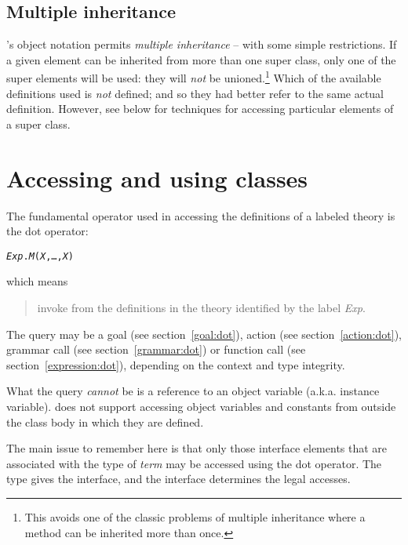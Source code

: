\subsection{Multiple inheritance}
\go's object notation permits \emph{multiple inheritance} -- with some simple restrictions. If a given element can be inherited from more than one super class, only one of the super elements will be used: they will \emph{not} be unioned.\footnote{This avoids one of the classic problems of multiple inheritance where a method can be inherited more than once.} Which of the available definitions used is \emph{not} defined; and so they had better refer to the same actual definition.  However, see below for techniques for accessing particular elements of a super class.

\section{Accessing and using classes}
\label{lo:access}

The fundamental operator used in accessing the definitions of a labeled theory is the dot operator:
\begin{alltt}
\emph{Exp}.\emph{M}(\emph{X},\ldots,\emph{X\subn})
\end{alltt}
which means
\begin{quote}
invoke  from the definitions in the theory identified by the label \emph{Exp}.
\end{quote}

The query  may be a goal (see section~\vref{goal:dot}), action (see section~\vref{action:dot}), grammar call (see section~\vref{grammar:dot}) or function call (see section~\vref{expression:dot}), depending on the context and type integrity. 
\begin{aside}
What the query \emph{cannot} be is a reference to an object variable (a.k.a. instance variable). \go does not support accessing object variables and constants from outside the class body in which they are defined.
\end{aside}

The main issue to remember here is that only those interface elements that are associated with the type of \emph{term} may be accessed using the dot operator. The type gives the interface, and the interface determines the legal accesses.

